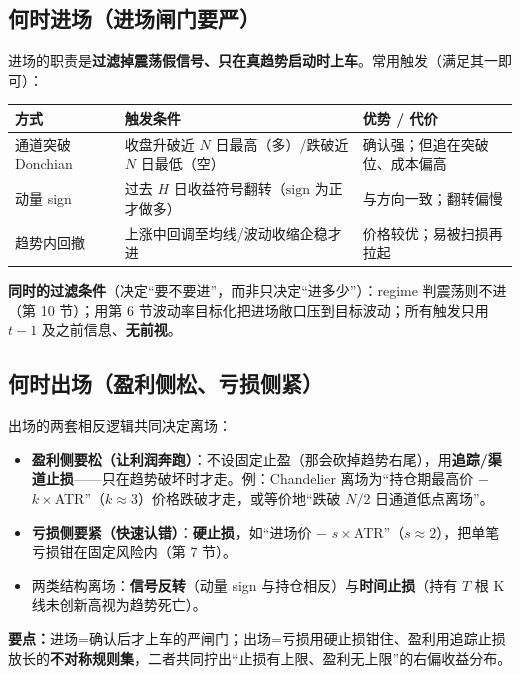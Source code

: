 \documentclass[UTF8,11pt]{ctexart}
\newcommand{\takeaway}[1]{\medskip\par\noindent\textbf{要点：}#1\par\medskip}
\begin{document}
\subsection{何时进场（进场闸门要严）}
进场的职责是\textbf{过滤掉震荡假信号、只在真趋势启动时上车}。常用触发（满足其一即可）：
\begin{center}
\setlength{\tabcolsep}{4pt}
\renewcommand{\arraystretch}{1.35}
\begin{tabular}{@{}>{\raggedright\arraybackslash}p{2.8cm}>{\raggedright\arraybackslash}p{5.0cm}>{\raggedright\arraybackslash}p{3.4cm}@{}}
\toprule
方式 & 触发条件 & 优势 / 代价 \\
\midrule
通道突破 Donchian & 收盘升破近 $N$ 日最高（多）/跌破近 $N$ 日最低（空） & 确认强；但追在突破位、成本偏高 \\
动量 sign & 过去 $H$ 日收益符号翻转（$\mathrm{sign}$ 为正才做多） & 与方向一致；翻转偏慢 \\
趋势内回撤 & 上涨中回调至均线/波动收缩企稳才进 & 价格较优；易被扫损再拉起 \\
\bottomrule
\end{tabular}
\end{center}
\textbf{同时的过滤条件}（决定“要不要进”，而非只决定“进多少”）：regime 判震荡则不进（第 10 节）；用第 6 节波动率目标化把进场敞口压到目标波动；所有触发只用 $t-1$ 及之前信息、\textbf{无前视}。

\subsection{何时出场（盈利侧松、亏损侧紧）}
出场的两套相反逻辑共同决定离场：
\begin{itemize}[itemsep=2pt]
\item \textbf{盈利侧要松（让利润奔跑）}：不设固定止盈（那会砍掉趋势右尾），用\textbf{追踪/渠道止损}——只在趋势破坏时才走。例：Chandelier 离场为“持仓期最高价 $-$ $k\times$ATR”（$k\approx3$）价格跌破才走，或等价地“跌破 $N/2$ 日通道低点离场”。
\item \textbf{亏损侧要紧（快速认错）}：\textbf{硬止损}，如“进场价 $-$ $s\times$ATR”（$s\approx2$），把单笔亏损钳在固定风险内（第 7 节）。
\item 两类结构离场：\textbf{信号反转}（动量 sign 与持仓相反）与\textbf{时间止损}（持有 $T$ 根 K 线未创新高视为趋势死亡）。
\end{itemize}

\takeaway{进场=确认后才上车的严闸门；出场=亏损用硬止损钳住、盈利用追踪止损放长的\textbf{不对称规则集}，二者共同拧出“止损有上限、盈利无上限”的右偏收益分布。}
\end{document}
